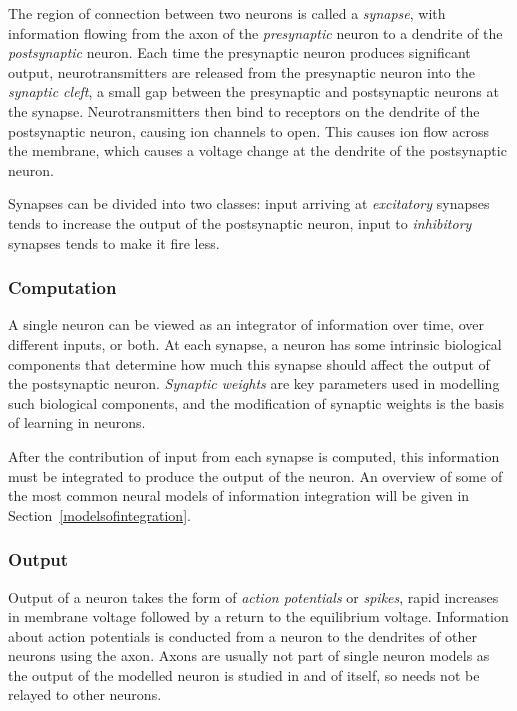 \documentclass[a4paper,12pt]{report}
\theoremstyle{definition}
\begin{document}
The region of connection between two neurons is called a \emph{synapse}, with information flowing from the axon of the \emph{presynaptic} neuron to a dendrite of the \emph{postsynaptic} neuron. Each time the presynaptic neuron produces significant output, neurotransmitters are released from the presynaptic neuron into the \emph{synaptic cleft}, a small gap between the presynaptic and postsynaptic neurons at the synapse.
Neurotransmitters then bind to receptors on the dendrite of the postsynaptic neuron, causing ion channels to open. This causes ion flow across the membrane, which causes a voltage change at the dendrite of the postsynaptic neuron.

Synapses can be divided into two classes: input arriving at \emph{excitatory} synapses tends to increase the output of the postsynaptic neuron, input to \emph{inhibitory} synapses tends to make it fire less.

\subsubsection{Computation}
A single neuron can be viewed as an integrator of information over time, over different inputs, or both. At each synapse, a neuron has some intrinsic biological components that determine how much this synapse should affect the output of the postsynaptic neuron. \emph{Synaptic weights} are key parameters used in modelling such biological components, and the modification of synaptic weights is the basis of learning in neurons.

After the contribution of input from each synapse is computed, this information must be integrated to produce the output of the neuron. An overview of some of the most common neural models of information integration will be given in Section~\ref{modelsofintegration}.

\subsubsection{Output}

Output of a neuron takes the form of \emph{action potentials} or \emph{spikes}, rapid increases in membrane voltage followed by a return to the equilibrium voltage. Information about action potentials is conducted from a neuron to the dendrites of other neurons using the axon. Axons are usually not part of single neuron models as the output of the modelled neuron is studied in and of itself, so needs not be relayed to other neurons.
\end{document}

